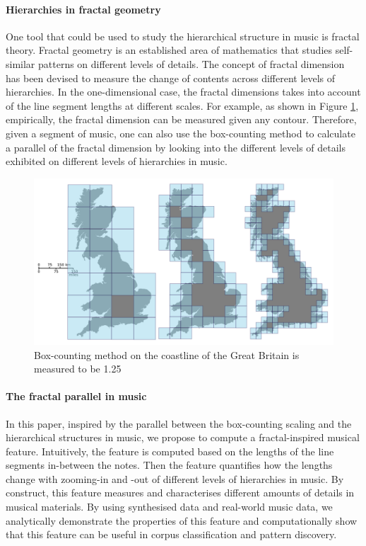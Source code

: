 \documentclass[acmsmall,10pt]{acmart}%
\begin{document}
\paragraph{Hierarchies in fractal geometry}

One tool that could be used to study the hierarchical structure in music is
fractal theory. Fractal geometry is an established area of
mathematics that studies self-similar patterns on different levels of details. The
concept of fractal dimension has been devised to measure the change of contents
across different levels of hierarchies. In the one-dimensional case,
the fractal dimensions takes into account of the line segment lengths at
different scales. For example, as shown in Figure \ref{fig:bc}, empirically, the
fractal dimension can be measured given any contour. Therefore, given a segment
of music, one can also use
the box-counting method to
calculate a parallel of the fractal dimension by looking into the different levels
of details exhibited on different levels of hierarchies in music.

\begin{figure}
  \includegraphics[width=0.7 \linewidth]{Great_Britain_Box.png}
  \caption{Box-counting method on the coastline of the Great Britain is measured to be 1.25}
  \label{fig:bc}
\end{figure}

\paragraph{The fractal parallel in music}
In this paper, inspired by the parallel between the box-counting scaling and the
hierarchical structures in music, we propose to compute a fractal-inspired
musical feature. Intuitively, the feature is computed based on the lengths of the line segments in-between the
notes. Then the feature quantifies how the lengths change with zooming-in and -out of different levels of
hierarchies in music. By construct, this feature measures and characterises
different amounts of details in musical materials. By using synthesised data and
real-world music data, we analytically demonstrate the properties of this
feature and computationally show that this feature can be useful in corpus classification and
pattern discovery. 
\end{document}
